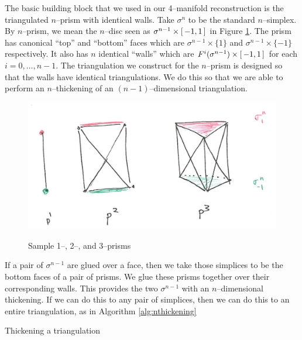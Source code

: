 The basic building block that we used in our 4--manifold reconstruction is the triangulated $n$--prism with identical walls.
Take $\sigma^n$ to be the standard $n$--simplex.
By $n$--prism, we mean the $n$--disc seen as $\sigma^{n-1}\times [\,-1,1\,]$ in Figure \ref{fig:nprism}.
The prism has canonical ``top'' and ``bottom'' faces which are $\sigma^{n-1}\times \{1\}$ and $\sigma^{n-1}\times \{-1\}$ respectively.
It also has $n$ identical ``walls'' which are $F^i(\sigma^{n-1})\times [\,-1,1\,]$ for each $i=0,\dots,n-1$.
The triangulation we construct for the $n$--prism is designed so that the walls have identical triangulations.
We do this so that we are able to perform an $n$--thickening of an $(n-1)$--dimensional triangulation.

\begin{figure}
	\centering
	\captionsetup{justification=centering}
	\caption{Sample 1--, 2--, and 3--prisms}
	\includegraphics[width = 5.5in]{figures/nprism.jpg}
	\label{fig:nprism}
\end{figure}

If a pair of $\sigma^{n-1}$ are glued over a face, then we take those simplices to be the bottom faces of a pair of prisms.
We glue these prisms together over their corresponding walls.
This provides the two $\sigma^{n-1}$ with an $n$--dimensional thickening.
If we can do this to any pair of simplices, then we can do this to an entire triangulation, as in Algorithm \ref{alg:nthickening}

\begin{algorithm}
	\caption{Thickening a triangulation}
	\label{alg:nthickening}
\end{algorithm}


